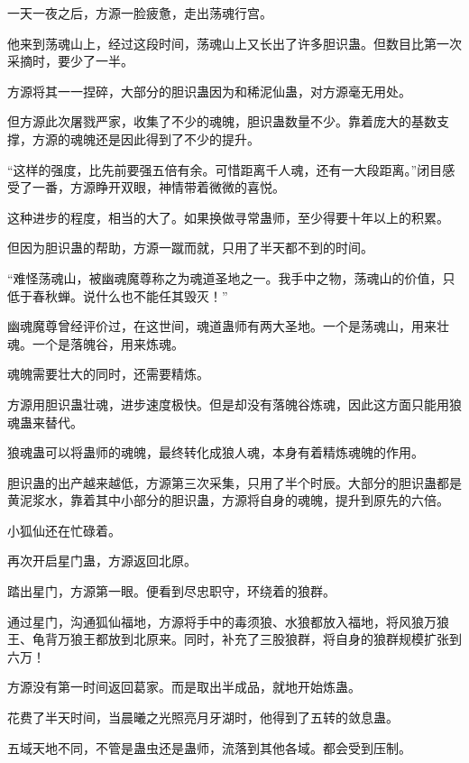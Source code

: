 
\begin{this_body}



一天一夜之后，方源一脸疲惫，走出荡魂行宫。

他来到荡魂山上，经过这段时间，荡魂山上又长出了许多胆识蛊。但数目比第一次采摘时，要少了一半。

方源将其一一捏碎，大部分的胆识蛊因为和稀泥仙蛊，对方源毫无用处。

但方源此次屠戮严家，收集了不少的魂魄，胆识蛊数量不少。靠着庞大的基数支撑，方源的魂魄还是因此得到了不少的提升。

“这样的强度，比先前要强五倍有余。可惜距离千人魂，还有一大段距离。”闭目感受了一番，方源睁开双眼，神情带着微微的喜悦。

这种进步的程度，相当的大了。如果换做寻常蛊师，至少得要十年以上的积累。

但因为胆识蛊的帮助，方源一蹴而就，只用了半天都不到的时间。

“难怪荡魂山，被幽魂魔尊称之为魂道圣地之一。我手中之物，荡魂山的价值，只低于春秋蝉。说什么也不能任其毁灭！”

幽魂魔尊曾经评价过，在这世间，魂道蛊师有两大圣地。一个是荡魂山，用来壮魂。一个是落魄谷，用来炼魂。

魂魄需要壮大的同时，还需要精炼。

方源用胆识蛊壮魂，进步速度极快。但是却没有落魄谷炼魂，因此这方面只能用狼魂蛊来替代。

狼魂蛊可以将蛊师的魂魄，最终转化成狼人魂，本身有着精炼魂魄的作用。

胆识蛊的出产越来越低，方源第三次采集，只用了半个时辰。大部分的胆识蛊都是黄泥浆水，靠着其中小部分的胆识蛊，方源将自身的魂魄，提升到原先的六倍。

小狐仙还在忙碌着。

再次开启星门蛊，方源返回北原。

踏出星门，方源第一眼。便看到尽忠职守，环绕着的狼群。

通过星门，沟通狐仙福地，方源将手中的毒须狼、水狼都放入福地，将风狼万狼王、龟背万狼王都放到北原来。同时，补充了三股狼群，将自身的狼群规模扩张到六万！

方源没有第一时间返回葛家。而是取出半成品，就地开始炼蛊。

花费了半天时间，当晨曦之光照亮月牙湖时，他得到了五转的敛息蛊。

五域天地不同，不管是蛊虫还是蛊师，流落到其他各域。都会受到压制。


\end{this_body}
